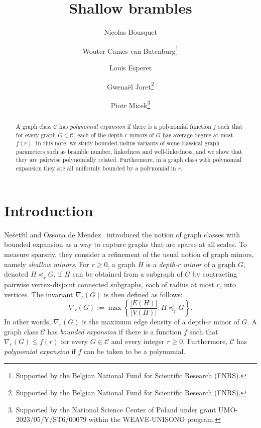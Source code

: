 \documentclass[final]{dmtcs-episciences}
\author[Nicolas Bousquet et al.]{Nicolas Bousquet\affiliationmark{1,2}
  \and Wouter Cames van Batenburg\affiliationmark{3}\thanks{Supported by the Belgian National Fund for Scientific Research (FNRS).}\\
  \and Louis Esperet\affiliationmark{4}
  \and Gwena\"el Joret\affiliationmark{3}\thanks{Supported by the Belgian National Fund for Scientific Research (FNRS).}
\and Piotr Micek\affiliationmark{5}\thanks{Supported by the National Science Center of Poland under grant UMO-2023/05/Y/ST6/00079 within the WEAVE-UNISONO program.}}
\title[Shallow brambles]{Shallow brambles}
\affiliation{
LIRIS, CNRS, Universit\'e Claude Bernard Lyon 1, Lyon, France \\
CRM-CNRS, Montreal, Canada \\
Computer Science Department,  Universit\'e libre de Bruxelles, Brussels, Belgium\\
G-SCOP,   CNRS, Universit\'e Grenoble Alpes,  Grenoble, France\\
Faculty of Mathematics and Computer Science,
Jagiellonian University, Kraków, Poland}
\theoremstyle{definition}
\theoremstyle{remark}
\renewcommand{\leq}{\leqslant}
\renewcommand{\geq}{\geqslant}
\begin{document}
\maketitle
\begin{abstract}
  A graph class $\mathcal{C}$ has \emph{polynomial expansion} if there is a polynomial function $f$ such that for every graph $G\in \mathcal{C}$, each of the depth-$r$ minors of $G$ has average degree at most $f(r)$. 
In this note, we study bounded-radius variants of some classical graph parameters such as bramble number, linkedness and well-linkedness, and we show that they are pairwise polynomially related. Furthermore, in a  graph class with polynomial expansion they are all uniformly bounded by a polynomial in $r$.
\end{abstract}

\section{Introduction}

Nešetřil and Ossona de Mendez~\cite{sparsity} introduced the notion of graph classes with bounded expansion as a way to capture graphs that are sparse at all scales. 
To measure sparsity, they consider a refinement of the usual notion of graph minors, namely {\em shallow minors}. 
For $r\geq 0$, a graph $H$ is a \emph{depth-$r$ minor} of a graph $G$, denoted $H \preccurlyeq_r G$, if $H$ can be obtained from a subgraph of $G$ by contracting pairwise vertex-disjoint connected subgraphs, each 
of radius at most $r$, into vertices.  
The invariant $\nabla_r(G)$ is then defined as follows: 
\[
\nabla_r(G):= \max \left\{ \frac{|E(H)|}{|V(H)|}: H \preccurlyeq_r G \right\}.
\]
In other words, $\nabla_r(G)$ is the maximum edge density  of a depth-$r$ minor of $G$. 
A graph class $\mathcal{C}$ has \emph{bounded expansion} if there is a function $f$ such that $\nabla_r(G) \leq f(r)$ for every $G\in \mathcal{C}$ and every integer $r\geq 0$. 
Furthermore, $\mathcal{C}$ has \emph{polynomial expansion} if $f$ can be taken to be a polynomial.
\end{document}
